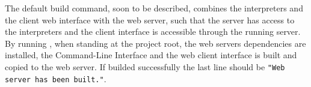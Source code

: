 \noindent
The default build command, soon to be described, combines the interpreters and the client web interface with the web server, such that the server has access to the interpreters and the client interface is accessible through the running server.\\
By running , when standing at the project root, the web servers dependencies are installed, the Command-Line Interface and the web client interface is built and copied to the web server.
If builded successfully the last line should be \texttt{"Web server has been built."}.
